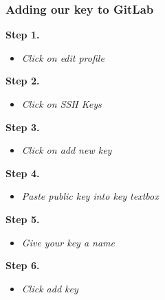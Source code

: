 \documentclass{beamer}
\begin{document}
\begin{frame}
	\frametitle{\textbf{Adding our key to GitLab}}

	\textbf{Step 1.}
	\begin{itemize}
		\item \textit{Click on edit profile}
	\end{itemize}

	\textbf{Step 2.}
	\begin{itemize}
		\item \textit{Click on SSH Keys}
	\end{itemize}

	\textbf{Step 3.}
	\begin{itemize}
		\item \textit{Click on add new key}
	\end{itemize}

	\textbf{Step 4.}
	\begin{itemize}
		\item \textit{Paste public key into key textbox}
	\end{itemize}

	\textbf{Step 5.}
	\begin{itemize}
		\item \textit{Give your key a name}
	\end{itemize}

	\textbf{Step 6.}
	\begin{itemize}
		\item \textit{Click add key}
	\end{itemize}

\end{frame}
\end{document}
